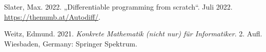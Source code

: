 \documentclass[
  letterpaper,
  DIV=11,
  oneside]{scrreprt}
\newlength{\cslhangindent}
\newlength{\cslentryspacingunit} %
\newenvironment{CSLReferences}[2] %
 {%
  \setlength{\parindent}{0pt}
  \ifodd #1
  \let\oldpar\par
  \def\par{\hangindent=\cslhangindent\oldpar}
  \fi
  \setlength{\parskip}{#2\cslentryspacingunit}
 }%
 {}
\theoremstyle{definition}
\theoremstyle{definition}
\theoremstyle{remark}
\begin{document}
\begin{CSLReferences}{1}{0}
\leavevmode{}%
Slater, Max. 2022. {„Differentiable programming from scratch``}. Juli
2022. \url{https://thenumb.at/Autodiff/}.

\leavevmode{}%
Weitz, Edmund. 2021. \emph{Konkrete Mathematik (nicht nur) f{ü}r
Informatiker}. 2. Aufl. Wiesbaden, Germany: Springer Spektrum.

\end{CSLReferences}
\end{document}
